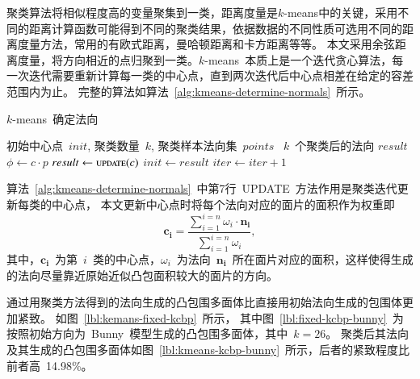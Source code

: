 聚类算法将相似程度高的变量聚集到一类，距离度量是$k$-means中的关键，采用不同的距离计算函数可能得到不同的聚类结果，依据数据的不同性质可选用不同的距离度量方法，常用的有欧式距离，曼哈顿距离和卡方距离等等。
本文采用余弦距离度量，将方向相近的点归聚到一类。$k$-means~本质上是一个迭代贪心算法，每一次迭代需要重新计算每一类的中心点，直到两次迭代后中心点相差在给定的容差范围内为止。
完整的算法如算法~\ref{alg:kmeans-determine-normals}~所示。

\begin{algorithm}
\small
\caption{$k$-means~确定法向}
\label{alg:kmeans-determine-normals}
\begin{algorithmic}[1]
\Require
初始中心点~$init$, 聚类数量~$k$, 聚类样本法向集~$points$
\Ensure
~$k$~个聚类后的法向 $result$
        \State $\phi \gets c \cdot p$ 
    \EndFor
    \State $result \gets \Call{update}{c}$ 
        \State {}
        \State {}
    \Else
        \State $init \gets result $
        \State $iter \gets iter+1 $
    \EndIf
    \EndFor
  \EndFor
\EndFunction
\end{algorithmic}
\end{algorithm}

算法~\ref{alg:kmeans-determine-normals}~中第7行~UPDATE~方法作用是聚类迭代更新每类的中心点，
本文更新中心点时将每个法向对应的面片的面积作为权重即
\begin{equation}
\label{equ:kmeans-update-center}
\bm{c_i}=\frac{\sum_{i=1}^{i=n} \omega_i \cdot \bm{n_i} } {\sum_{i=1}^{i=n} \omega_i}
,
\end{equation}
其中，$\bm{c_i}$~为第~$i$~类的中心点，$\omega_i$~为法向~$\bm{n_i}$~所在面片对应的面积，这样使得生成的法向尽量靠近原始近似凸包面积较大的面片的方向。

通过用聚类方法得到的法向生成的凸包围多面体比直接用初始法向生成的包围体更加紧致。
如图~\ref{lbl:kemans-fixed-kcbp}~所示， 
其中图~\ref{lbl:fixed-kcbp-bunny}~为按照初始方向为~Bunny~模型生成的凸包围多面体，其中~$k=26$。
聚类后其法向及其生成的凸包围多面体如图~\ref{lbl:kmeans-kcbp-bunny}~所示，后者的紧致程度比前者高~14.98\%。

